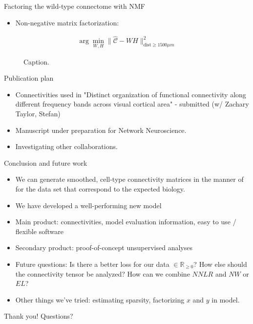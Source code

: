 \documentclass{beamer}
\begin{document}
\begin{frame}{Factoring the wild-type connectome with NMF}
\begin{itemize}
    \item Non-negative matrix factorization:
\end{itemize}
\begin{eqnarray*}
\arg \min_{W,H} \|\hat{  \mathcal C}  - WH  \|_{\text{dist}\geq 1500 \mu m}^2
\end{eqnarray*}
    \begin{figure}
    \centering
{}
\caption{Caption.}
\label{fig:caption}
    \end{figure}
\end{frame}

\begin{frame}{Publication plan}
\begin{itemize}
    \item Connectivities used in "Distinct organization of functional connectivity along different frequency bands across visual cortical area" - submitted (w/ Zachary Taylor, Stefan)
    \item Manuscript under preparation for Network Neuroscience.
    \item Investigating other collaborations.
\end{itemize}
\end{frame}

\begin{frame}{Conclusion and future work}
\begin{itemize}
    \item We can generate smoothed, cell-type connectivity matrices in the manner of \citeauthor{Knox2019-ot} for the \citeauthor{Harris2019-mr} data set that correspond to the expected biology.
    \item We have developed a well-performing new model
    \item Main product: connectivities, model evaluation information, easy to use / flexible software
    \item Secondary product: proof-of-concept unsupervised analyses
    \item Future questions: Is there a better loss for our data $\in \mathbb R_{\geq 0}$? How else should the connectivity tensor be analyzed? How can we combine $NNLR$ and $NW$ or $EL$?
    \item Other things we've tried: estimating sparsity, factorizing $x$ and $y$ in model.
\end{itemize}
\end{frame}

\begin{frame}{Thank you!}
Questions?
\end{frame}
\end{document}
